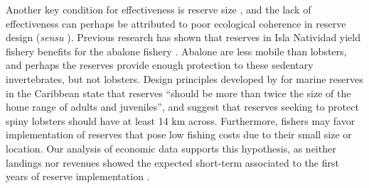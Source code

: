 \documentclass{frontiersSCNS}
\providecommand{\DIFaddtex}[1]{{\protect\color{blue}\uwave{#1}}} %
\providecommand{\DIFdeltex}[1]{{\protect\color{red}\sout{#1}}}                      %
\providecommand{\DIFaddbegin}{} %
\providecommand{\DIFaddend}{} %
\providecommand{\DIFdelbegin}{} %
\providecommand{\DIFdelend}{} %
\providecommand{\DIFadd}[1]{\texorpdfstring{\DIFaddtex{#1}}{#1}} %
\providecommand{\DIFdel}[1]{\texorpdfstring{\DIFdeltex{#1}}{}} %
\begin{document}
Another key condition for effectiveness is reserve size
\citep{edgar_2014-UO}, and the lack of effectiveness can perhaps be
attributed to poor ecological coherence in reserve design (\emph{sensu}
\citet{rees_2018}). Previous research has shown that reserves in Isla
Natividad yield fishery benefits for the abalone fishery
\citep{rossetto_2015-V0}. Abalone are less mobile than lobsters, and
perhaps the reserves provide enough protection to these sedentary
invertebrates, but not lobsters. Design principles developed by
\citet{green_2017} for marine reserves in the Caribbean state that
reserves ``should be more than twice the size of the home range of
adults and juveniles'', and suggest that reserves seeking to protect
spiny lobsters should have at least 14 km across. Furthermore, fishers
may favor implementation of reserves that pose low fishing costs due to
their small size or location. Our analysis of economic data supports
this hypothesis, as neither landings nor revenues showed the expected
short-term \DIFdelbegin %
\DIFdelend \DIFaddbegin \DIFadd{reductions }\DIFaddend associated to the first years of reserve
implementation \citep{ovando_2016-Wg}.
\end{document}
